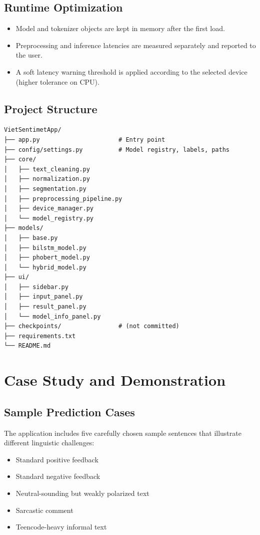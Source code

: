\documentclass[12pt]{report} %
\begin{document}
\subsection{Runtime Optimization}

\begin{itemize}
    \item Model and tokenizer objects are kept in memory after the first load.
    \item Preprocessing and inference latencies are measured separately and reported to the user.
    \item A soft latency warning threshold is applied according to the selected device (higher tolerance on CPU).
\end{itemize}

\subsection{Project Structure}

\begin{verbatim}
VietSentimetApp/
├── app.py                      # Entry point
├── config/settings.py          # Model registry, labels, paths
├── core/
│   ├── text_cleaning.py
│   ├── normalization.py
│   ├── segmentation.py
│   ├── preprocessing_pipeline.py
│   ├── device_manager.py
│   └── model_registry.py
├── models/
│   ├── base.py
│   ├── bilstm_model.py
│   ├── phobert_model.py
│   └── hybrid_model.py
├── ui/
│   ├── sidebar.py
│   ├── input_panel.py
│   ├── result_panel.py
│   └── model_info_panel.py
├── checkpoints/                # (not committed)
├── requirements.txt
└── README.md
\end{verbatim}

\section{Case Study and Demonstration}
\label{sec:case-study}

\subsection{Sample Prediction Cases}

The application includes five carefully chosen sample sentences that illustrate different linguistic challenges:
\begin{itemize}
    \item Standard positive feedback
    \item Standard negative feedback
    \item Neutral-sounding but weakly polarized text
    \item Sarcastic comment
    \item Teencode-heavy informal text
\end{itemize}
\end{document}
